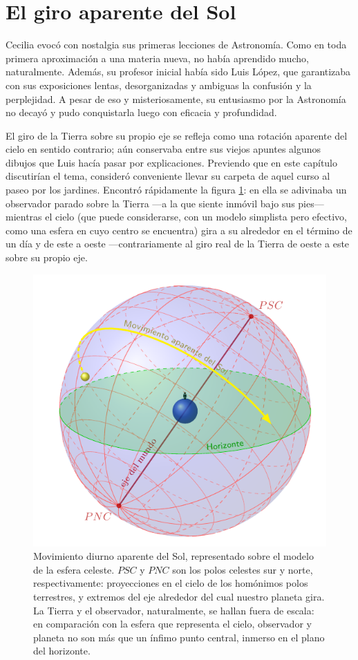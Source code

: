 \section{El giro aparente del Sol}

Cecilia evocó con nostalgia sus primeras lecciones de Astronomía. Como
en toda primera aproximación a una materia nueva, no había aprendido
mucho, naturalmente. Además, su profesor inicial había sido Luis
López, que garantizaba con sus exposiciones lentas, desorganizadas y
ambiguas la confusión y la perplejidad. A pesar de eso y
misteriosamente, su entusiasmo por la Astronomía no decayó y pudo
conquistarla luego con eficacia y profundidad.

El giro de la Tierra sobre su propio eje se refleja como una rotación
aparente del cielo en sentido contrario; aún conservaba entre sus
viejos apuntes algunos dibujos que Luis hacía pasar por
explicaciones. Previendo que en este capítulo discutirían el tema,
consideró conveniente llevar su carpeta de aquel curso al paseo por
los jardines. Encontró rápidamente la figura \ref{fig:mov-ap}: en ella
se adivinaba un observador parado sobre la Tierra ---a la que siente
inmóvil bajo sus pies--- mientras el cielo (que puede considerarse,
con un modelo simplista pero efectivo, como una esfera en cuyo centro
se encuentra) gira a su alrededor en el término de un día y de este a
oeste ---contrariamente al giro real de la Tierra de oeste a este
sobre su propio eje.

\begin{figure}[t]
  \centering
  \includegraphics[width=.5\textwidth]{imagenes/movimiento-aparente-solar}
  \caption{Movimiento diurno aparente del Sol, representado sobre el
    modelo de la esfera celeste. $PSC$ y $PNC$ son los polos celestes
    sur y norte, respectivamente: proyecciones en el cielo de los
    homónimos polos terrestres, y extremos del eje alrededor del cual
    nuestro planeta gira. La Tierra y el observador, naturalmente, se
    hallan fuera de escala: en comparación con la esfera que
    representa el cielo, observador y planeta no son más que un
    ínfimo punto central, inmerso en el plano del horizonte.  }
  \label{fig:mov-ap}
\end{figure}


